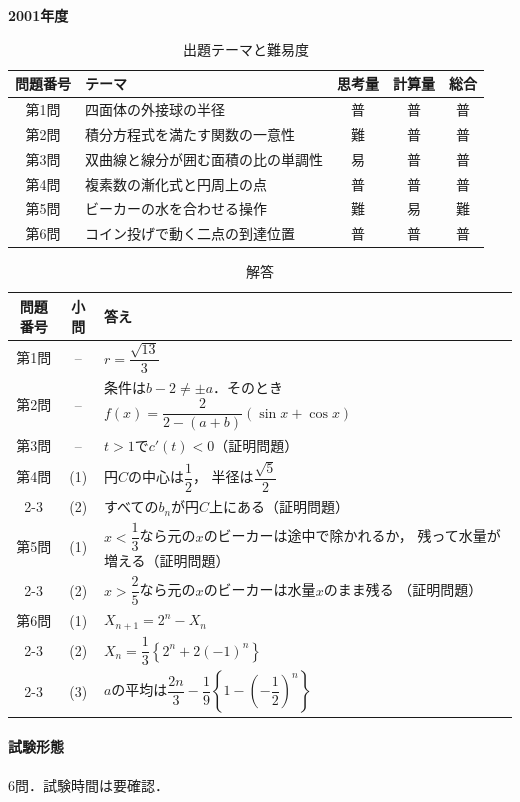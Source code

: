 \documentclass[../../main.tex]{subfiles}
\begin{document}
\begin{center}
  {\fontsize{48pt}{58pt}\selectfont \textbf{2001}\normalsize\textbf{年度}}
\end{center}

\begin{table}[htb]
  \centering
  \caption{出題テーマと難易度}
  \begin{tabular}{|c|p{6.2cm}|c|c|c|}
    \hline
    \textbf{問題番号} & \textbf{テーマ} & \textbf{思考量} & \textbf{計算量} & \textbf{総合} \\
    \hline
    第1問 & 四面体の外接球の半径 & 普 & 普 & 普 \\
    \hline
    第2問 & 積分方程式を満たす関数の一意性 & 難 & 普 & 普 \\
    \hline
    第3問 & 双曲線と線分が囲む面積の比の単調性 & 易 & 普 & 普 \\
    \hline
    第4問 & 複素数の漸化式と円周上の点 & 普 & 普 & 普 \\
    \hline
    第5問 & ビーカーの水を合わせる操作 & 難 & 易 & 難 \\
    \hline
    第6問 & コイン投げで動く二点の到達位置 & 普 & 普 & 普 \\
    \hline
  \end{tabular}
\end{table}

\begin{table}[htb]
  \centering
  \caption{解答}
  \renewcommand{\arraystretch}{1.4}
  \begin{tabular}{|c|c|p{9cm}|}
    \hline
    \textbf{問題番号} & \textbf{小問} & \textbf{答え} \\
    \hline
    第1問 & -- & $r=\dfrac{\sqrt{13}}{3}$ \\
    \hline
    第2問 & -- & 条件は$b-2\ne\pm a$．そのとき
    $f(x)=\dfrac{2}{2-(a+b)}(\sin x+\cos x)$ \\
    \hline
    第3問 & -- & $t>1$で$c'(t)<0$（証明問題） \\
    \hline
    第4問 & (1) & 円$C$の中心は$\dfrac{1}{2}$，
    半径は$\dfrac{\sqrt{5}}{2}$ \\
    \cline{2-3}
    & (2) & すべての$b_n$が円$C$上にある（証明問題） \\
    \hline
    第5問 & (1) & $x<\dfrac{1}{3}$なら元の$x$のビーカーは途中で除かれるか，
    残って水量が増える（証明問題） \\
    \cline{2-3}
    & (2) & $x>\dfrac{2}{5}$なら元の$x$のビーカーは水量$x$のまま残る
    （証明問題） \\
    \hline
    第6問 & (1) & $X_{n+1}=2^n-X_n$ \\
    \cline{2-3}
    & (2) & $X_n=\dfrac{1}{3}\left\{2^n+2(-1)^n\right\}$ \\
    \cline{2-3}
    & (3) & $a$の平均は$\dfrac{2n}{3}-\dfrac{1}{9}
    \left\{1-\left(-\dfrac{1}{2}\right)^n\right\}$ \\
    \hline
  \end{tabular}
\end{table}

\paragraph{試験形態}
6問．試験時間は要確認．
\end{document}
